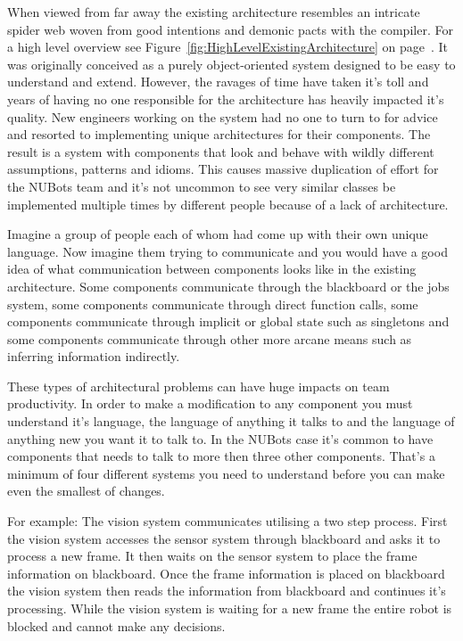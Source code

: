 \documentclass[english,12pt]{scrartcl}
\begin{document}
			When viewed from far away the existing architecture resembles an intricate spider web
			woven from good intentions and demonic pacts with the compiler.
			For a high level overview see Figure~\ref{fig:HighLevelExistingArchitecture} on page~\pageref{fig:HighLevelExistingArchitecture}.
			It was originally conceived as a purely object-oriented system designed to be easy to understand and extend.
			However, the ravages of time have taken it's toll and years of having no one responsible for
			the architecture has heavily impacted it's quality.
			New engineers working on the system had no one to turn to for advice and resorted to
			implementing unique architectures for their components.
			The result is a system with components that look and behave with wildly different assumptions, patterns and
			idioms.
			This causes massive duplication of effort for the NUBots team and it's not uncommon to see very similar classes be
			implemented multiple times by different people because of a lack of architecture.

			Imagine a group of people each of whom had come up with their own unique language.
			Now imagine them trying to communicate and you would have a good idea of what communication
			between components looks like in the existing architecture.
			Some components communicate through the blackboard or the jobs system, some components communicate through
			direct function calls, some components communicate through implicit or global state such as singletons and some
			components communicate through other more arcane means such as inferring information indirectly.

			These types of architectural problems can have huge impacts on team productivity.
			In order to make a modification to any component you must understand it's language, the language of anything
			it talks to and the language of anything new you want it to talk to. In the NUBots case it's common to have components
			that needs to talk to more then three other components.
			That's a minimum of four different systems you need to understand before you can make even the smallest of changes.

			For example: The vision system communicates utilising a two step process.
			First the vision system accesses the sensor system through blackboard and asks it to process a new frame.
			It then waits on the sensor system to place the frame information on blackboard.
			Once the frame information is placed on blackboard the vision system then reads the information
			from blackboard and continues it's processing.
			While the vision system is waiting for a new frame the entire robot is blocked and cannot make any decisions.
\end{document}
